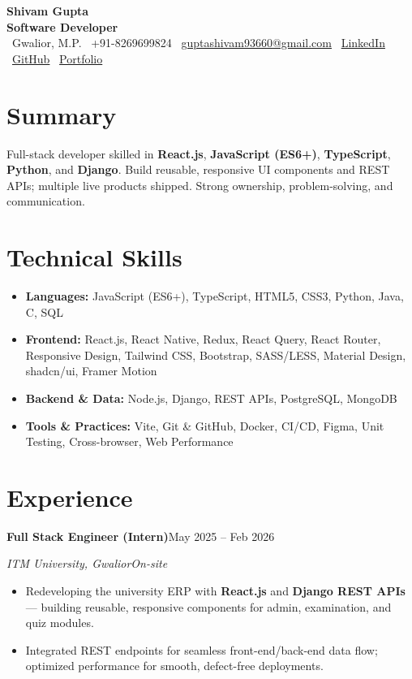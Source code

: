 \documentclass[a4paper,10pt]{article}
\newcommand{\rolesubtitle}{Software Developer} %
\newcommand{\entry}[4]{%
  \vspace{3pt}%
  \textbf{#1}\hfill #2\par
  \vspace{1pt}%
  \textit{#3}\hfill \textit{#4}\par
  \vspace{2pt}%
}
\begin{document}
\begin{center}
  {\Huge \textbf{Shivam Gupta}}\\[4pt]
  {\color{accent}\textbf{\rolesubtitle}}\\[5pt]
  {\small
  \faMapMarker~Gwalior, M.P. \quad
  \faPhone~+91-8269699824 \quad
  \faEnvelope~\href{mailto:guptashivam93660@gmail.com}{guptashivam93660@gmail.com} \quad
  \faLinkedin~\href{https://www.linkedin.com/in/ur-990q}{LinkedIn} \quad
  \faGithub~\href{https://github.com/Shivam990q}{GitHub} \quad
  \faGlobe~\href{https://shivam-portfolio-a1s4.onrender.com}{Portfolio}}
\end{center}

\section{Summary}
Full-stack developer skilled in \textbf{React.js}, \textbf{JavaScript (ES6+)}, \textbf{TypeScript},
\textbf{Python}, and \textbf{Django}. Build reusable, responsive UI components and REST APIs;
multiple live products shipped. Strong ownership, problem-solving, and communication.

\section{Technical Skills}
\begin{itemize}[label={}, leftmargin=0pt, topsep=2pt, itemsep=2pt]
  \item \textbf{Languages:} JavaScript (ES6+), TypeScript, HTML5, CSS3, Python, Java, C, SQL
  \item \textbf{Frontend:} React.js, React Native, Redux, React Query, React Router, Responsive
        Design, Tailwind CSS, Bootstrap, SASS/LESS, Material Design, shadcn/ui, Framer Motion
  \item \textbf{Backend \& Data:} Node.js, Django, REST APIs, PostgreSQL, MongoDB
  \item \textbf{Tools \& Practices:} Vite, Git \& GitHub, Docker, CI/CD, Figma, Unit Testing,
        Cross-browser, Web Performance
\end{itemize}

\section{Experience}
\entry{Full Stack Engineer (Intern)}{May 2025 -- Feb 2026}{ITM University, Gwalior}{On-site}
\begin{itemize}
  \item Redeveloping the university ERP with \textbf{React.js} and \textbf{Django REST APIs} ---
        building reusable, responsive components for admin, examination, and quiz modules.
  \item Integrated REST endpoints for seamless front-end/back-end data flow; optimized
        performance for smooth, defect-free deployments.
\end{itemize}
\end{document}
